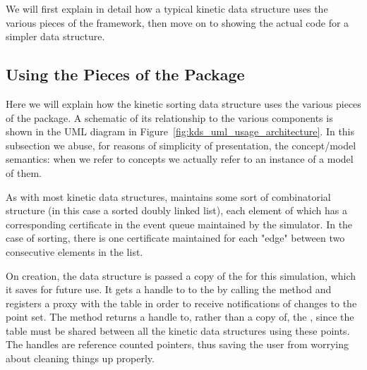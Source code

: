



We will first explain in detail how a typical kinetic data structure
uses the various pieces of the framework, then move on to showing the
actual code for a simpler data structure.

\subsection{Using the Pieces of the Package}

Here we will explain how the kinetic sorting data structure uses the
various pieces of the package. A schematic of its relationship to the
various components is shown in the UML diagram in
Figure~\ref{fig:kds_uml_usage_architecture}. In this subsection we
abuse, for reasons of simplicity of presentation, the concept/model
semantics: when we refer to concepts we actually refer to an instance
of a model of them.

As with most kinetic data structures,  maintains some sort of combinatorial structure (in this
case a sorted doubly linked list), each element of which has a
corresponding certificate in the event queue maintained by the
simulator. In the case of sorting, there is one certificate maintained
for each "edge" between two consecutive elements in the list.

On creation, the data structure is passed a copy of the
 for this simulation, which it saves for
future use. It gets a handle to to the
 by calling the
method and registers a proxy with the table in order to receive
notifications of changes to the point set.  The
 method returns a handle to, rather
than a copy of, the , since the table must
be shared between all the kinetic data structures using these points.
The handles are reference counted pointers, thus saving the user from
worrying about cleaning things up properly.

